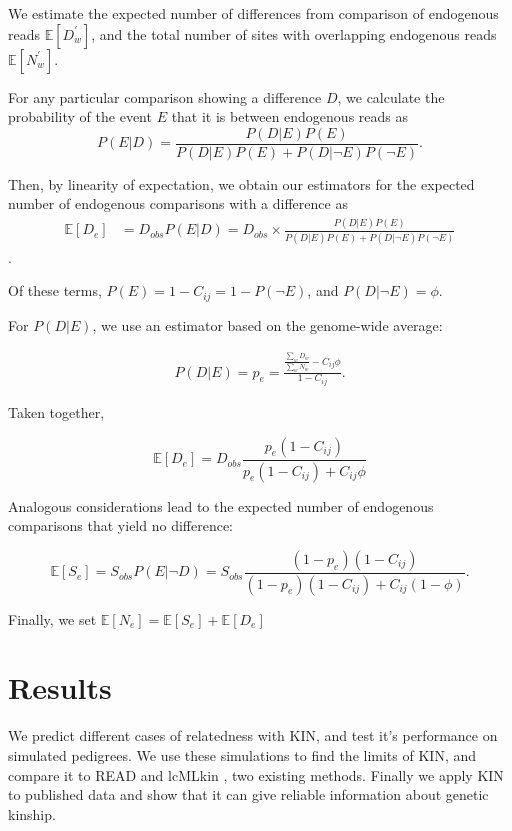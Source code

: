 \documentclass[12pt, letterpaper]{article}
\begin{document}
We  estimate the expected number of differences from comparison of endogenous reads $\mathbb{E}[D_w^{'}]$, and the total number of sites with overlapping endogenous reads $\mathbb{E}[N_w^{'}]$. 

For any particular comparison showing a difference $D$, we calculate the probability of the event $E$ that it is between endogenous reads as 
\begin{equation}
    P(E|D) = \frac{P(D|E)P(E)}{P(D|E)P(E) + P(D| \neg E)P( \neg E)}.
\end{equation}

Then, by linearity of expectation, we obtain our estimators for the expected number of endogenous comparisons with a difference as 
\begin{align}
    \mathbb{E}[D_e] &= D_{obs} P(E|D) = D_{obs} \times \frac{P(D|E)P(E)}{P(D|E)P(E) + P(D| \neg E)P( \neg E)}
\end{align}.

Of these terms, $P(E)= 1 -C_{ij} = 1 - P(\neg E)$, and $P(D| \neg E) = \phi$.

For $P(D|E)$, we use an estimator based on the genome-wide average: 

\begin{align}
    P(D|E) = p_e = \frac{\frac{\sum_w D_w}{\sum_w N_w} - C_{ij} \phi}{1 - C_{ij}}.
\end{align}

Taken together, 

\begin{equation}
 \mathbb{E}[D_e]= D_{obs}\frac{p_e (1-C_{ij})}{p_e(1-C_{ij}) + C_{ij}\phi}
 \end{equation}
 
 Analogous considerations lead to the expected number of endogenous comparisons that yield no difference:
 
 \begin{equation}
\mathbb{E}[S_e] = S_{obs} P(E| \neg D) = S_{obs} \frac{(1-p_e)(1-C_{ij})}{(1-p_e)(1-C_{ij}) + C_{ij}(1-\phi)}.
 \end{equation}

Finally, we set $\mathbb{E}[N_e] = \mathbb{E}[S_e] + \mathbb{E}[D_e]$




\section{Results}\label{results}



We predict different cases of relatedness with KIN, and test it's performance on simulated pedigrees. We use these simulations to find the limits of KIN, and compare it to READ and lcMLkin \cite{lipatov_maximum_2015}, two existing methods. Finally we apply KIN to published data and show that it can give reliable information about genetic kinship.
\end{document}
